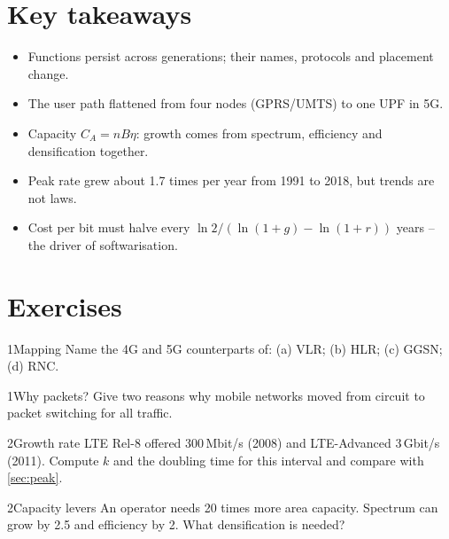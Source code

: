 \documentclass[11pt,a4paper]{article}
\begin{document}
\section{Key takeaways}
\begin{takeawaybox}
\begin{itemize}
  \item Functions persist across generations; their names, protocols and placement change.
  \item The user path flattened from four nodes (GPRS/UMTS) to one UPF in 5G.
  \item Capacity $C_A = nB\eta$: growth comes from spectrum, efficiency and densification together.
  \item Peak rate grew about 1.7 times per year from 1991 to 2018, but trends are not laws.
  \item Cost per bit must halve every $\ln 2/(\ln(1+g) - \ln(1+r))$ years -- the driver of softwarisation.
\end{itemize}
\end{takeawaybox}

\section{Exercises}

\begin{exercisebox}{1}{Mapping}\label{exr:map}
Name the 4G and 5G counterparts of: (a) VLR; (b) HLR; (c) GGSN; (d) RNC.
\end{exercisebox}

\begin{exercisebox}{1}{Why packets?}\label{exr:why}
Give two reasons why mobile networks moved from circuit to packet switching for all traffic.
\end{exercisebox}

\begin{exercisebox}{2}{Growth rate}\label{exr:cagr}
LTE Rel-8 offered 300\,Mbit/s (2008) and LTE-Advanced 3\,Gbit/s (2011). Compute $k$ and the doubling time for this interval and compare with \cref{sec:peak}.
\end{exercisebox}

\begin{exercisebox}{2}{Capacity levers}\label{exr:cap}
An operator needs 20 times more area capacity. Spectrum can grow by 2.5 and efficiency by 2. What densification is needed?
\end{exercisebox}
\end{document}
